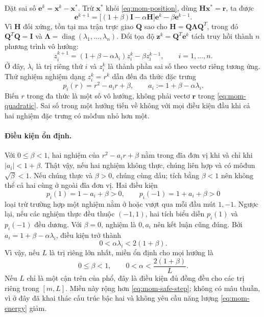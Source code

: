Đặt sai số $\mathbf{e}^{k}=\mathbf{x}^{k}-\mathbf{x}^{*}$.
Trừ $\mathbf{x}^{*}$ khỏi \eqref{eq:mom-position}, dùng
$\mathbf{H}\mathbf{x}^{*}=\mathbf{r}$, ta được
\begin{equation}
 \mathbf{e}^{k+1}=\big[(1+\beta)\mathbf{I}-\alpha\mathbf{H}\big]
                  \mathbf{e}^{k}-\beta\mathbf{e}^{k-1}.
 \label{eq:mom-error}
\end{equation}
Vì $\mathbf{H}$ đối xứng, tồn tại ma trận trực giao $\mathbf{Q}$ sao cho
$\mathbf{H}=\mathbf{Q}\boldsymbol{\Lambda}\mathbf{Q}^{T}$, trong đó
$\mathbf{Q}^{T}\mathbf{Q}=\mathbf{I}$ và
$\boldsymbol{\Lambda}=\operatorname{diag}(\lambda_1,\ldots,\lambda_n)$.
Đổi tọa độ $\mathbf{z}^{k}=\mathbf{Q}^{T}\mathbf{e}^{k}$ tách truy hồi
thành $n$ phương trình vô hướng:
\begin{equation}
 z_i^{k+1}=(1+\beta-\alpha\lambda_i)z_i^{k}-\beta z_i^{k-1},
 \qquad i=1,\ldots,n.
 \label{eq:mom-mode}
\end{equation}
Ở đây, $\lambda_i$ là trị riêng thứ $i$ và $z_i^{k}$ là thành phần sai
số theo vectơ riêng tương ứng. Thử nghiệm nghiệm dạng $z_i^{k}=r^k$
dẫn đến đa thức đặc trưng
\begin{equation}
 p_i(r)=r^2-a_i r+\beta,
 \qquad a_i:=1+\beta-\alpha\lambda_i.
 \label{eq:mom-characteristic}
\end{equation}
Biến $r$ trong đa thức là một số vô hướng, không phải vectơ
$\mathbf{r}$ trong \eqref{eq:mom-quadratic}.
Sai số trong một hướng tiến về không với mọi điều kiện đầu khi cả hai
nghiệm đặc trưng có môđun nhỏ hơn một.

\paragraph{Điều kiện ổn định.}
Với $0\leq\beta<1$, hai nghiệm của $r^2-a_i r+\beta$ nằm trong đĩa đơn
vị khi và chỉ khi $|a_i|<1+\beta$.
Thật vậy, nếu hai nghiệm không thực, chúng liên hợp và có môđun
$\sqrt{\beta}<1$. Nếu chúng thực và $\beta>0$, chúng cùng dấu;
tích bằng $\beta<1$ nên không thể cả hai cùng ở ngoài đĩa đơn vị.
Hai điều kiện
\[
 p_i(1)=1-a_i+\beta>0,\qquad
 p_i(-1)=1+a_i+\beta>0
\]
loại trừ trường hợp một nghiệm nằm ở hoặc vượt qua mỗi đầu mút $1,-1$.
Ngược lại, nếu các nghiệm thực đều thuộc $(-1,1)$, hai tích biểu diễn
$p_i(1)$ và $p_i(-1)$ đều dương. Với $\beta=0$, nghiệm là $0,a_i$ nên
kết luận cũng đúng. Bởi $a_i=1+\beta-\alpha\lambda_i$, điều kiện trở thành
\begin{equation}
 0<\alpha\lambda_i<2(1+\beta).
 \label{eq:mom-mode-stability}
\end{equation}
Vì vậy, nếu $L$ là trị riêng lớn nhất, miền ổn định cho mọi hướng là
\begin{equation}
 0\leq\beta<1,\qquad 0<\alpha<\frac{2(1+\beta)}{L}.
 \label{eq:mom-quadratic-stability}
\end{equation}
Nếu $L$ chỉ là một cận trên của phổ, đây là điều kiện đủ đồng đều cho
các trị riêng trong $[m,L]$. Miền này rộng hơn
\eqref{eq:mom-safe-step}; không có mâu thuẫn, vì ở đây đã khai thác cấu
trúc bậc hai và không yêu cầu năng lượng \eqref{eq:mom-energy} giảm.

